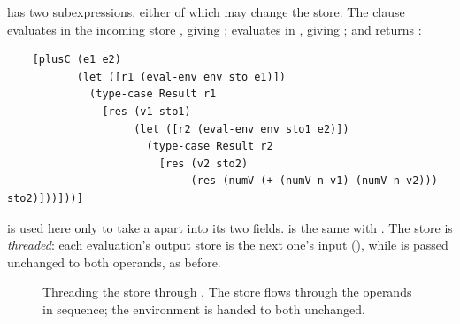  has two subexpressions, either of which may change the store. The clause evaluates  in the incoming store , giving ; evaluates  in , giving ; and returns :
\begin{lstlisting}
    [plusC (e1 e2)
           (let ([r1 (eval-env env sto e1)])
             (type-case Result r1
               [res (v1 sto1)
                    (let ([r2 (eval-env env sto1 e2)])
                      (type-case Result r2
                        [res (v2 sto2)
                             (res (numV (+ (numV-n v1) (numV-n v2))) sto2)]))]))]
\end{lstlisting}
 is used here only to take a  apart into its two fields.  is the same with \code{*}. The store is \emph{threaded}: each evaluation's output store is the next one's input (), while  is passed unchanged to both operands, as before.

\begin{figure}[htbp]
\centering
{}
\caption{Threading the store through . The store flows through the operands in sequence; the environment is handed to both unchanged.}
\label{fig:thread}
\end{figure}

